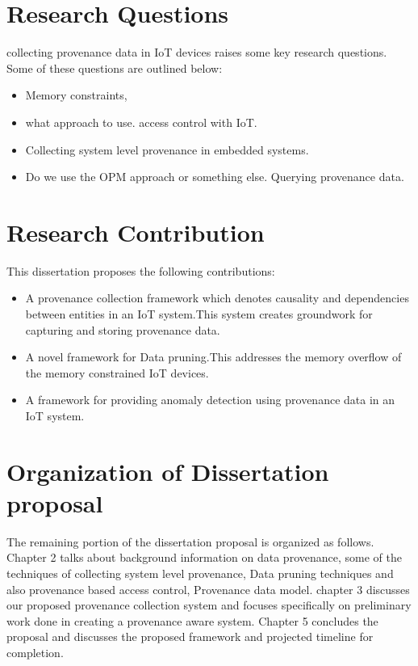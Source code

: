 \section{Research Questions}
collecting provenance data in IoT devices raises some key research questions. Some of these questions are outlined below:

\begin{itemize}

\item Memory constraints, 

\item what approach to use. access control with IoT. 

\item Collecting system level provenance in embedded systems. 

\item Do we use the OPM approach or something else. Querying provenance data.
\end{itemize}

\section{Research Contribution}

This dissertation proposes the following contributions:

\begin{itemize}
  \item A provenance collection framework which denotes causality and dependencies between entities in an IoT system.This system creates groundwork for capturing and storing provenance data.
  \item A novel framework for Data pruning.This addresses the memory overflow of the memory constrained IoT devices.
   \item A framework for providing anomaly detection using provenance data in an IoT system.
\end{itemize}

\section{Organization of Dissertation proposal}

The remaining portion of the dissertation proposal is organized as follows.  Chapter 2 talks about background information on data provenance, some of the techniques of collecting system level provenance, Data pruning techniques and also provenance based access control, Provenance data model. chapter 3 discusses our proposed provenance collection system  and focuses specifically on preliminary work done in creating a provenance aware system. Chapter 5 concludes the proposal and discusses the proposed framework and projected timeline for completion.

